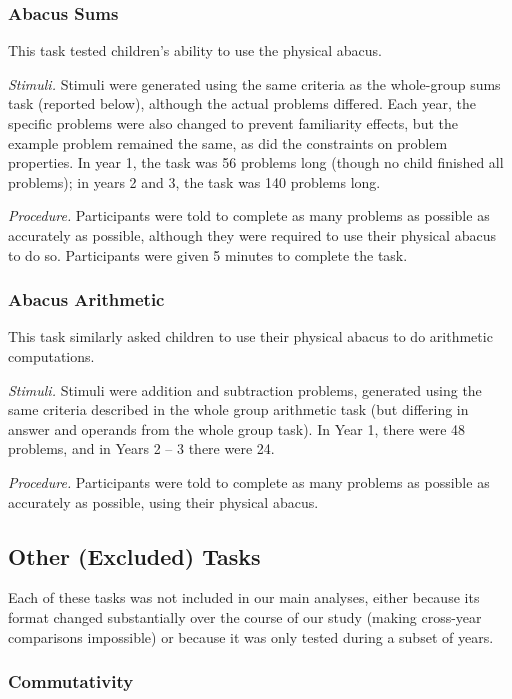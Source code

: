 \documentclass[11pt]{article}
\begin{document}
\subsubsection{Abacus Sums}

This task tested children's ability to use the physical abacus.

{\it Stimuli.} Stimuli were generated using the same criteria as the whole-group sums task (reported below), although the actual problems differed. Each year, the specific problems were also changed to prevent familiarity effects, but the example problem remained the same, as did the constraints on problem properties. In year 1, the task was 56 problems long (though no child finished all problems); in years 2 and 3, the task was 140 problems long. 

{\it Procedure.} Participants were told to complete as many problems as possible as accurately as possible, although they were required to use their physical abacus to do so. Participants were given 5 minutes to complete the task.

\subsubsection{Abacus Arithmetic}

This task similarly asked children to use their physical abacus to do arithmetic computations.

{\it Stimuli.} Stimuli were addition and subtraction problems, generated using the same criteria described in the whole group arithmetic task (but differing in answer and operands from the whole group task). In Year 1, there were 48 problems, and in Years 2 -- 3 there were 24. 

{\it Procedure.} Participants were told to complete as many problems as possible as accurately as possible, using their physical abacus.

\subsection{Other (Excluded) Tasks}

Each of these tasks was not included in our main analyses, either because its format changed substantially over the course of our study (making cross-year comparisons impossible) or because it was only tested during a subset of years. 

\subsubsection{Commutativity}
\end{document}
